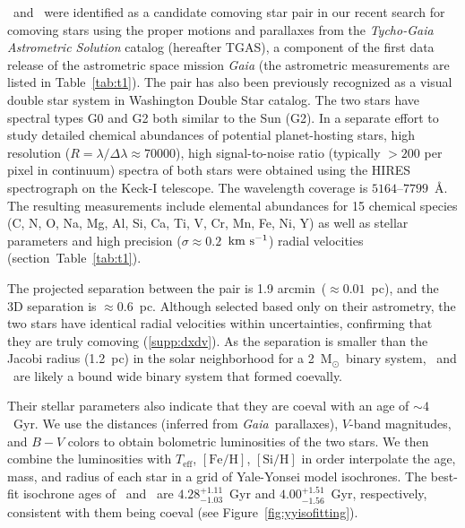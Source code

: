\documentclass[12pt,letterpaper,margin=1in]{article}
\newcommand{\project}[1]{\textsl{#1}}
\newcommand{\acronym}[1]{{\small{#1}}}
\newcommand{\gaia}{\project{Gaia}}
\newcommand{\tgas}{\acronym{TGAS}}
\newcommand*\elem[1]{\ensuremath{\mathrm{#1}}}
\newcommand*\elemH[1]{\ensuremath{[\mathrm{#1}/\elem{H}]}}
\newcommand{\sunanalog}{\text{Krios}}
\newcommand{\bizarreone}{\text{Kronos}}
\newcommand{\kms}{\ensuremath{\rm km~s^{-1}}}
\newcommand{\msun}{\ensuremath{{\mathrm M}_\odot}}
\renewcommand\tablename{Table}
\begin{document}
\sunanalog\ and \bizarreone\ were identified as a candidate comoving star pair
in our recent search for comoving stars using the proper motions and parallaxes
from the {\it Tycho-Gaia Astrometric Solution} catalog (hereafter \tgas), a
component of the first data release of the astrometric space mission \gaia\cite{2016A&A...595A...2G}
(the astrometric measurements are listed in \tablename~\ref{tab:t1}).
The pair has also been previously recognized as a visual double star system
in Washington Double Star catalog\cite{2001AJ....122.3466M}.
The two stars have spectral types G0 and G2 both similar to the Sun (G2).
In a separate effort to study detailed chemical abundances of potential
planet-hosting stars, high resolution ($R=\lambda/\Delta\lambda\approx 70000$),
high signal-to-noise ratio (typically $>200$ per pixel in continuum) spectra of
both stars were obtained using the HIRES spectrograph on the Keck-I
telescope\cite{2016ApJS..225...32B}. 
The wavelength coverage is $5164$--$7799$~\AA.
The resulting measurements include elemental abundances for 15 chemical species
(C, N, O, Na, Mg, Al, Si, Ca, Ti, V, Cr, Mn, Fe, Ni, Y) as well as stellar
parameters and high precision ($\sigma\approx0.2$~\kms) radial velocities
(section~Table~\ref{tab:t1}).

The projected separation between the pair is 1.9 arcmin\ ($\approx 0.01$~pc),
and the 3D separation is $\approx 0.6$~pc.
Although selected based only on their astrometry, the two stars
have identical radial velocities within uncertainties,
confirming that they are truly comoving (\ref{supp:dxdv}).
As the separation is smaller than the Jacobi radius (1.2~pc) in the solar
neighborhood for a 2~\msun\ binary system\cite{Jiang:2010aa}, \bizarreone\ and
\sunanalog\ are likely a bound wide binary system that formed coevally.

Their stellar parameters also indicate that they are coeval with an age of $\sim 4$~Gyr.
We use the distances (inferred from \gaia\ parallaxes), $V$-band magnitudes,
and $B-V$ colors to obtain bolometric luminosities of the two stars\cite{2003AJ....126..778V}.
We then combine the luminosities with $T_\mathrm{eff}$, \elemH{Fe}, \elemH{Si}
in order interpolate the age, mass, and radius of each star
in a grid of Yale-Yonsei model isochrones\cite{2013ApJ...776...87S}.
The best-fit isochrone ages of \bizarreone\ and \sunanalog\ are
$4.28_{-1.03}^{+1.11}$~Gyr and $4.00_{-1.56}^{+1.51}$~Gyr, respectively,
consistent with them being coeval (see Figure~\ref{fig:yyisofitting}).
\end{document}
